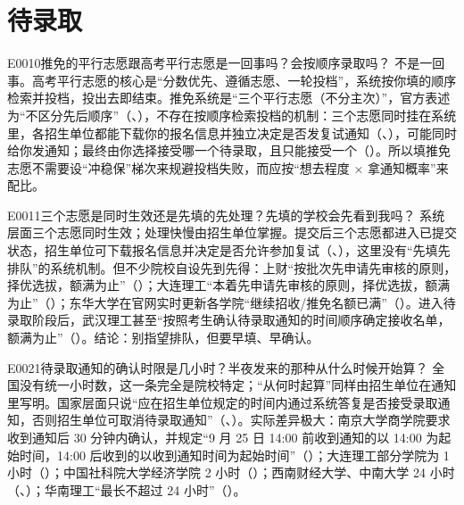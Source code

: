 \section{待录取}
\begin{qa}{E0010}{推免的平行志愿跟高考平行志愿是一回事吗？会按顺序录取吗？}
不是一回事。高考平行志愿的核心是“分数优先、遵循志愿、一轮投档”，系统按你填的顺序检索并投档，投出去即结束。推免系统是“三个平行志愿（不分主次）”，官方表述为“不区分先后顺序”（、），不存在按顺序检索投档的机制：三个志愿同时挂在系统里，各招生单位都能下载你的报名信息并独立决定是否发复试通知（、），可能同时给你发通知；最终由你选择接受哪一个待录取，且只能接受一个（）。所以填推免志愿不需要设“冲稳保”梯次来规避投档失败，而应按“想去程度 × 拿通知概率”来配比。
\end{qa}

\begin{qa}{E0011}{三个志愿是同时生效还是先填的先处理？先填的学校会先看到我吗？}
系统层面三个志愿同时生效；处理快慢由招生单位掌握。提交后三个志愿都进入已提交状态，招生单位可下载报名信息并决定是否允许参加复试（、），这里没有“先填先排队”的系统机制。但不少院校自设先到先得：上财“按批次先申请先审核的原则，择优选拔，额满为止”（）；大连理工“本着先申请先审核的原则，择优选拔，额满为止”（）；东华大学在官网实时更新各学院“继续招收/推免名额已满”（）。进入待录取阶段后，武汉理工甚至“按照考生确认待录取通知的时间顺序确定接收名单，额满为止”（）。结论：别指望排队，但要早填、早确认。
\end{qa}

\begin{qa}{E0021}{待录取通知的确认时限是几小时？半夜发来的那种从什么时候开始算？}
全国没有统一小时数，这一条完全是院校特定；“从何时起算”同样由招生单位在通知里写明。国家层面只说“应在招生单位规定的时间内通过系统答复是否接受录取通知，否则招生单位可取消待录取通知”（、）。实际差异极大：南京大学商学院要求收到通知后 30 分钟内确认，并规定“9 月 25 日 14:00 前收到通知的以 14:00 为起始时间，14:00 后收到的以收到通知时间为起始时间”（）；大连理工部分学院为 1 小时（）；中国社科院大学经济学院 2 小时（）；西南财经大学、中南大学 24 小时（、）；华南理工“最长不超过 24 小时”（）。
\end{qa}

